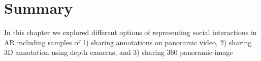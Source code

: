 \section{Summary}

In this chapter we explored different options of representing social interactions in AR including samples of 1) sharing annotations on panoramic video, 2) sharing 3D annotation using depth cameras, and 3) sharing 360 panoramic image 

